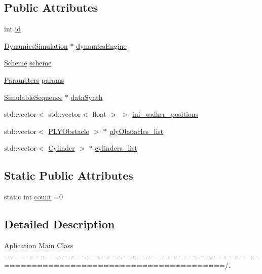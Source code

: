 \subsection*{Public Attributes}
\begin{DoxyCompactItemize}
\item 
int \hyperlink{class_m_c_simulation_aff828a83a905ae188146d3ffaa12a1bc}{id}
\item 
\hyperlink{class_dynamics_simulation}{Dynamics\+Simulation} $\ast$ \hyperlink{class_m_c_simulation_ac453455b2dfb994b7b1a4b7823bd3dc9}{dynamics\+Engine}
\item 
\hyperlink{class_scheme}{Scheme} \hyperlink{class_m_c_simulation_a87ba6332f1f49024a442981b477360c4}{scheme}
\item 
\hyperlink{class_parameters}{Parameters} \hyperlink{class_m_c_simulation_aecb8470cb31fa67e38c5d5acd5a80bef}{params}
\item 
\hyperlink{class_simulable_sequence}{Simulable\+Sequence} $\ast$ \hyperlink{class_m_c_simulation_a7e2496127af6436d64bca7f52bc40c82}{data\+Synth}
\item 
std\+::vector$<$ std\+::vector$<$ float $>$ $>$ \hyperlink{class_m_c_simulation_af53387a4edc7627a77ff03a562f8befa}{ini\+\_\+walker\+\_\+positions}
\item 
std\+::vector$<$ \hyperlink{class_p_l_y_obstacle}{P\+L\+Y\+Obstacle} $>$ $\ast$ \hyperlink{class_m_c_simulation_a8c21d28d54c9c947f6c5465657019ed4}{ply\+Obstacles\+\_\+list}
\item 
std\+::vector$<$ \hyperlink{class_cylinder}{Cylinder} $>$ $\ast$ \hyperlink{class_m_c_simulation_a36909899f67439feed1a980037ea8c03}{cylinders\+\_\+list}
\end{DoxyCompactItemize}
\subsection*{Static Public Attributes}
\begin{DoxyCompactItemize}
\item 
static int \hyperlink{class_m_c_simulation_aa3853b6cec83b055593cbf58def0c164}{count} =0
\end{DoxyCompactItemize}


\subsection{Detailed Description}
Aplication Main Class ======================================================================================/. 

